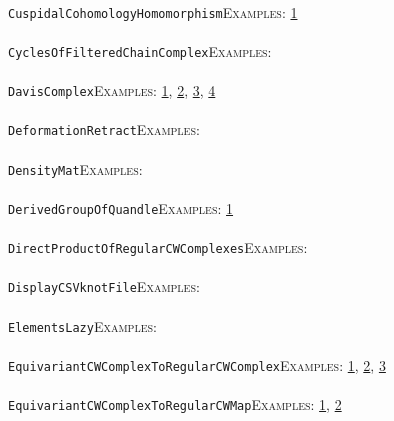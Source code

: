 \documentclass[a4paper,11pt]{report}
\begin{document}
{{ \\
 \texttt{CuspidalCohomologyHomomorphism}{\nobreakspace}{\nobreakspace}{\nobreakspace}{\nobreakspace}\textsc{Examples:} \href{tutorial/chap10.html} {1}{\nobreakspace} \\
 \\
 \texttt{CyclesOfFilteredChainComplex}{\nobreakspace}{\nobreakspace}{\nobreakspace}{\nobreakspace}\textsc{Examples:} \\
 \\
 \texttt{DavisComplex}{\nobreakspace}{\nobreakspace}{\nobreakspace}{\nobreakspace}\textsc{Examples:} \href{tutorial/chap8.html} {1}{\nobreakspace}, \href{../www/SideLinks/About/aboutBredon.html} {2}{\nobreakspace}, \href{../www/SideLinks/About/aboutDavisComplex.html} {3}{\nobreakspace}, \href{../www/SideLinks/About/aboutFunctorial.html} {4}{\nobreakspace} \\
 \\
 \texttt{DeformationRetract}{\nobreakspace}{\nobreakspace}{\nobreakspace}{\nobreakspace}\textsc{Examples:} \\
 \\
 \texttt{DensityMat}{\nobreakspace}{\nobreakspace}{\nobreakspace}{\nobreakspace}\textsc{Examples:} \\
 \\
 \texttt{DerivedGroupOfQuandle}{\nobreakspace}{\nobreakspace}{\nobreakspace}{\nobreakspace}\textsc{Examples:} \href{../www/SideLinks/About/aboutQuandles.html} {1}{\nobreakspace} \\
 \\
 \texttt{DirectProductOfRegularCWComplexes}{\nobreakspace}{\nobreakspace}{\nobreakspace}{\nobreakspace}\textsc{Examples:} \\
 \\
 \texttt{DisplayCSVknotFile}{\nobreakspace}{\nobreakspace}{\nobreakspace}{\nobreakspace}\textsc{Examples:} \\
 \\
 \texttt{ElementsLazy}{\nobreakspace}{\nobreakspace}{\nobreakspace}{\nobreakspace}\textsc{Examples:} \\
 \\
 \texttt{EquivariantCWComplexToRegularCWComplex}{\nobreakspace}{\nobreakspace}{\nobreakspace}{\nobreakspace}\textsc{Examples:} \href{tutorial/chap3.html} {1}{\nobreakspace}, \href{../www/SideLinks/About/aboutCoveringSpaces.html} {2}{\nobreakspace}, \href{../www/SideLinks/About/aboutCoverinSpaces.html} {3}{\nobreakspace} \\
 \\
 \texttt{EquivariantCWComplexToRegularCWMap}{\nobreakspace}{\nobreakspace}{\nobreakspace}{\nobreakspace}\textsc{Examples:} \href{../www/SideLinks/About/aboutCoveringSpaces.html} {1}{\nobreakspace}, \href{../www/SideLinks/About/aboutCoverinSpaces.html} {2}{\nobreakspace} \\
}}
\end{document}
